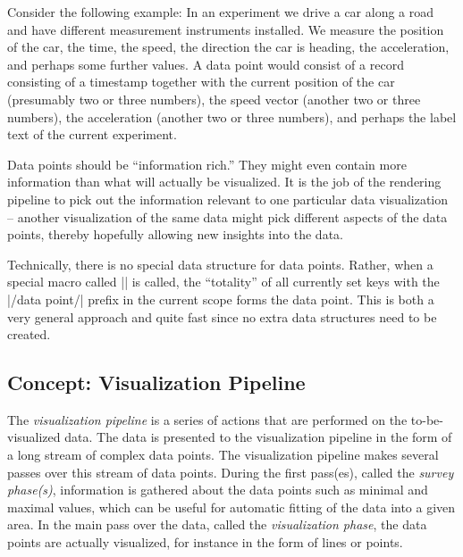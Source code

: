 Consider the following example: In an experiment we drive a car along
a road and have different measurement instruments installed. We
measure the position of the car, the time, the speed, the direction
the car is heading, the acceleration, and perhaps some further
values. A data point would consist of a record consisting of a
timestamp together with the current position of the car (presumably
two or three numbers), the speed vector (another two or three
numbers), the acceleration (another two or three numbers), and perhaps
the label text of the current experiment. 

Data points should be ``information rich.'' They might even contain
more information than what will actually be visualized. It is the job
of the rendering pipeline to pick out the information relevant to one
particular data visualization -- another visualization of the same
data might pick different aspects of the data points, thereby
hopefully allowing new insights into the data.

Technically, there is no special data structure for data
points. Rather, when a special macro called |\pgfdatapoint| is called,
the ``totality'' of all currently set keys with the |/data point/|
prefix in the current scope forms the data point. This is both a very
general approach and quite fast since no extra data structures need to
be created. 


\subsection{Concept: Visualization Pipeline}

The \emph{visualization pipeline} is a series of actions that are
performed on the to-be-visualized data. The
data is presented to the visualization pipeline in the form of a long
stream of  complex data points. The visualization pipeline makes
several passes over this stream of data points. During the first
pass(es), called the \emph{survey phase(s)}, information is gathered
about the data points such as minimal and maximal values, which can be
useful for automatic fitting of the data into a given area. In the
main pass over the data, called the \emph{visualization phase}, the
data points are actually visualized, for instance in the form of lines
or points. 

